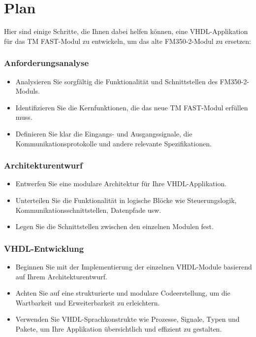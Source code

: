 \chapter{Plan} 

Hier sind einige Schritte, die Ihnen dabei helfen können, eine VHDL-Applikation für das TM FAST-Modul zu entwickeln, um das alte 
FM350-2-Modul zu ersetzen:

\subsection*{Anforderungsanalyse} 
\begin{itemize} 
    \item Analysieren Sie sorgfältig die Funktionalität und Schnittstellen des FM350-2-Moduls. 
    \item Identifizieren Sie die Kernfunktionen, die das neue TM FAST-Modul erfüllen muss. 
    \item Definieren Sie klar die Eingangs- und Ausgangssignale, die Kommunikationsprotokolle und andere relevante Spezifikationen. 
\end{itemize}

\subsection*{Architekturentwurf} 
\begin{itemize} 
    \item Entwerfen Sie eine modulare Architektur für Ihre VHDL-Applikation. 
    \item Unterteilen Sie die Funktionalität in logische Blöcke wie Steuerungslogik, Kommunikationsschnittstellen, Datenpfade usw. 
    \item Legen Sie die Schnittstellen zwischen den einzelnen Modulen fest. 
\end{itemize}

\subsection*{VHDL-Entwicklung} 
\begin{itemize} 
    \item Beginnen Sie mit der Implementierung der einzelnen VHDL-Module basierend auf Ihrem Architekturentwurf. 
    \item Achten Sie auf eine strukturierte und modulare Codeerstellung, um die Wartbarkeit und Erweiterbarkeit zu erleichtern. 
    \item Verwenden Sie VHDL-Sprachkonstrukte wie Prozesse, Signale, Typen und Pakete, um Ihre Applikation übersichtlich und 
    effizient zu gestalten. 
\end{itemize}

